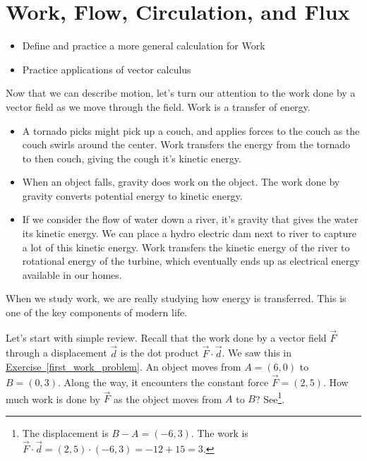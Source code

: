 \documentclass[10pt,]{book}
\theoremstyle{plain}
\theoremstyle{definition}
\theoremstyle{definition}
\theoremstyle{definition}
\theoremstyle{definition}
\theoremstyle{definition}
\numberwithin{equation}{section}
\begin{document}
\section[{Work, Flow, Circulation, and Flux}]{Work, Flow, Circulation, and Flux}\label{section-29}
\leavevmode%
\begin{itemize}[label=\textbullet]
\item{}Define and practice a more general calculation for Work%
\item{}Practice applications of vector calculus%
\end{itemize}
Now that we can describe motion, let's turn our attention to the work done by a vector field as we move through the field. Work is a transfer of energy. \leavevmode%
\begin{itemize}[label=\textbullet]
\item{}A tornado picks might pick up a couch, and applies forces to the couch as the couch swirls around the center. Work transfers the energy from the tornado to then couch, giving the cough it's kinetic energy.%
\item{}When an object falls, gravity does work on the object. The work done by gravity converts potential energy to kinetic energy.%
\item{}If we consider the flow of water down a river, it's gravity that gives the water its kinetic energy. We can place a hydro electric dam next to river to capture a lot of this kinetic energy.  Work transfers the kinetic energy of the river to rotational energy of the turbine, which eventually ends up as electrical energy available in our homes.%
\end{itemize}
%
\par
When we study work, we are really studying how energy is transferred. This is one of the key components of modern life.%
\par
Let's start with simple review. Recall that the work done by a vector field \(\vec F\) through a displacement \(\vec d\) is the dot product \(\vec F\cdot \vec d\). We saw this in \hyperref[first_work_problem]{Exercise~\ref{first_work_problem}}.%
An object moves from \(A=(6,0)\) to \(B=(0,3)\). Along the way, it encounters the constant force \(\vec F = (2,5)\). How much work is done by \(\vec F\) as the object moves from \(A\) to \(B\)? See\footnote{The displacement is \(B-A=(-6,3)\). The work is \(\vec F\cdot \vec d = (2,5)\cdot(-6,3) = -12+15=3\).\label{fn-17}}.%
\end{document}
